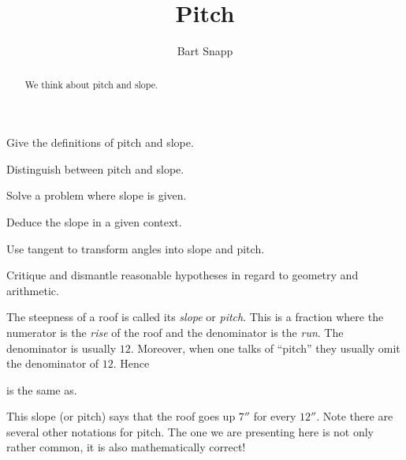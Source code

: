 \documentclass[noauthor,nooutcomes,hints,handout]{ximera}
\title{Pitch}
\author{Bart Snapp}
\begin{document}
\begin{abstract}
  We think about pitch and slope.
\end{abstract}
\maketitle

\begin{listOutcomes}
\item Give the definitions of pitch and slope.
\item Distinguish between pitch and slope.
\item Solve a problem where slope is given.
\item Deduce the slope in a given context.
\item Use tangent to transform angles into slope and pitch.
\item Critique and dismantle reasonable hypotheses in regard to geometry and arithmetic.
\end{listOutcomes}



The steepness of a roof is called its \textit{slope} or
\textit{pitch}. This is a fraction where the numerator is the
\textit{rise} of the roof and the denominator is the \textit{run}. The
denominator is usually $12$. Moreover, when one talks of ``pitch''
they usually omit the denominator of $12$. Hence
\begin{center}
\quad is the same as\quad {}.
\end{center}
This slope (or pitch) says that the roof goes up $7''$ for every
$12''$. Note there are several other notations for pitch. The one we
are presenting here is not only rather common, it is also
mathematically correct!

\mynewpage
\end{document}
